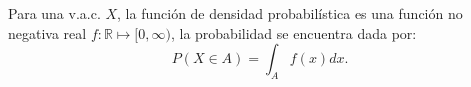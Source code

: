 \noindent Para  una v.a.c. $X$,  la función de densidad probabilística es una  función no negativa real $f:\mathbb{R}\mapsto[0,\infty)$, la probabilidad se encuentra dada por:
\begin{equation}
	P(X\in A)=\int_{A}f(x)dx.
\end{equation}
